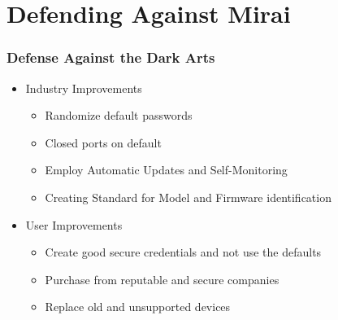 \documentclass{beamer}
\begin{document}
\section{Defending Against Mirai}
\begin{frame}
    \frametitle{Defense Against the Dark Arts}
    \begin{itemize}
        \item<+-> Industry Improvements
            \begin{itemize}
                \item<+-> Randomize default passwords
                \item<+-> Closed ports on default
                \item<+-> Employ Automatic Updates and Self-Monitoring
                \item<+-> Creating Standard for Model and Firmware identification
            \end{itemize}
        \item<+-> User Improvements
            \begin{itemize}
                \item<+-> Create good secure credentials and not use the defaults
                \item<+-> Purchase from reputable and secure companies
                \item<+-> Replace old and unsupported devices
            \end{itemize}
    \end{itemize}
    
\end{frame}
\end{document}
